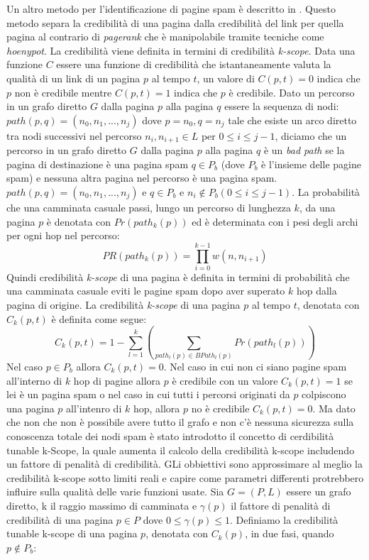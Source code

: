 Un altro metodo per l'identificazione di pagine spam è descritto in \cite{Caverlee:2007:CWS:1281100.1281124}. Questo metodo separa la credibilità di una pagina dalla credibilità del link per quella pagina al contrario di \textit{pagerank} che è manipolabile tramite tecniche come \textit{hoenypot}. La credibilità viene definita in termini di credibilità \textit{k-scope}. Data una funzione \(C\) essere una funzione di credibilità che istantaneamente valuta la qualità di un link di un pagina \(p\) al tempo \(t\), un valore di \(C(p,t)=0\) indica che \(p\) non è credibile mentre \(C(p,t)=1\) indica che \(p\) è credibile. Dato  un percorso in un grafo diretto \(G\) dalla pagina \(p\) alla pagina \(q\) essere la sequenza di nodi: \(path(p,q)=(n_0,n_1,...,n_j)\) dove \(p=n_0, q=n_j\) tale che esiste un arco diretto tra nodi successivi nel percorso \(n_i,n_{i+1}\in L\) per \(0\leq i \leq j-1\), diciamo che un percorso  in un grafo diretto \(G\) dalla pagina \(p\) alla pagina \(q\) è un \textit{bad path} se la pagina di destinazione è una pagina spam \(q\in P_b\) (dove \(P_b\) è l'insieme delle pagine spam) e nessuna altra pagina nel percorso è una pagina spam. \(path(p,q)=(n_0,n_1,...,n_j)\) e \(q\in P_b\) e \(n_i\not\in P_b (0\leq i\leq j-1)\). La probabilità che una camminata casuale passi, lungo un percorso di lunghezza \(k\), da una pagina \(p\) è denotata con \(Pr(path_k(p))\) ed è determinata con i pesi degli archi per ogni hop nel percorso:
\begin{equation}
 PR(path_k(p))=\prod_{i=0}^{k-1}w(n,n_{i+1})
\end{equation}
Quindi credibilità \textit{k-scope} di una pagina  è definita in termini di probabilità che una camminata casuale eviti le pagine spam dopo aver superato \(k\) hop dalla pagina di origine. La credibilità \textit{k-scope} di una pagina \(p\) al tempo \(t\), denotata con \(C_k(p,t)\) è definita come segue:
\begin{equation}
 C_k(p,t)=1-\sum_{l=1}^k\left (\sum_{path_l(p)\in BPath_l(p)}Pr(path_l(p))\right )
\end{equation}
Nel caso \(p\in P_b\) allora \(C_k(p,t)=0\). Nel caso in cui non ci siano pagine spam all'interno di \(k\) hop di pagine allora \(p\) è credibile con un valore \(C_k(p,t)=1\) se lei è un pagina spam o nel caso in cui tutti i percorsi originati da \(p\) colpiscono una pagina \(p\) all'intenro di \(k\) hop, allora \(p\) no è credibile \(C_k(p,t)=0\). Ma dato che non che non è possibile avere tutto il grafo e non c'è nessuna sicurezza sulla conoscenza totale dei nodi spam è stato introdotto il concetto di cerdibilità tunable k-Scope, la quale aumenta il calcolo della credibilità k-scope includendo un fattore di penalità di credibilità. GLi obbiettivi sono approssimare al meglio la credibilità k-scope sotto limiti reali e capire come parametri differenti protrebbero influire sulla qualità delle varie funzioni usate. Sia \(G=(P,L)\) essere un grafo diretto, k il raggio massimo di camminata e \(\gamma(p)\) il fattore di penalità di credibilità di una pagina \(p\in P\) dove \(0\leq \gamma(p)\leq 1\). Definiamo la credibilità tunable k-scope di una pagina \(p\), denotata con \(C_k(p)\), in due fasi, quando \(p \not \in P_b\):
